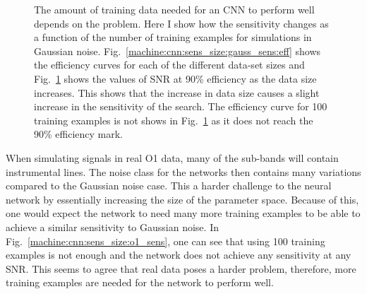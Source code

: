 \begin{figure}[h]
\begin{subfigure}[h]{0.5\textwidth}
		\label{machine:cnn:sens_size:gauss_sens:train}
		\caption{}
	\end{subfigure}
	\caption{The amount of training data needed for an \ac{CNN} to perform well depends on the problem. Here I show how the sensitivity changes as a function of the number of training examples for simulations in Gaussian noise. Fig.~\ref{machine:cnn:sens_size:gauss_sens:eff} shows the efficiency curves for each of the different data-set sizes and Fig.~\ref{machine:cnn:sens_size:gauss_sens:train} shows the values of \ac{SNR} at 90\% efficiency as the data size increases. This shows that the increase in data size causes a slight increase in the sensitivity of the search. The efficiency curve for 100 training examples is not shows in Fig.~\ref{machine:cnn:sens_size:gauss_sens:train} as it does not reach the 90\% efficiency mark. }
	\label{machine:cnn:sens_size:gauss_sens}
\end{figure}

When simulating signals in real O1 data, many of the sub-bands will contain instrumental lines. 
The noise class for the networks then contains many variations compared to the Gaussian noise case. 
This a harder challenge to the neural network by essentially increasing the size of the parameter space.
Because of this, one would expect the network to need many more training examples to be able to achieve a similar sensitivity to Gaussian noise.
In Fig.~\ref{machine:cnn:sens_size:o1_sens}, one can see that using 100 training examples is not enough and the network does not achieve any sensitivity at any \ac{SNR}.
This seems to agree that real data poses a harder problem, therefore, more training examples are needed for the network to perform well.

